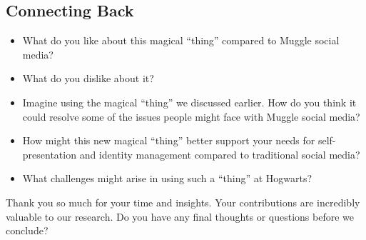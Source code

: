 \subsection*{Connecting Back}
\begin{itemize}
    \item What do you like about this magical “thing” compared to Muggle social media?
    \item What do you dislike about it?
    \item Imagine using the magical “thing” we discussed earlier. How do you think it could resolve some of the issues people might face with Muggle social media?
    \item How might this new magical “thing” better support your needs for self-presentation and identity management compared to traditional social media?
    \item What challenges might arise in using such a “thing” at Hogwarts?
\end{itemize}

Thank you so much for your time and insights. Your contributions are incredibly valuable to our research. Do you have any final thoughts or questions before we conclude?
